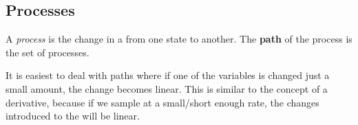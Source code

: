 \subsection{Processes}\label{subsec:Processes}
\begin{definition}[Process]\label{def:Process}
  A \emph{process} is the change in a  from one  state to another.
  The \textbf{path} of the process is the set of  processes.

  It is easiest to deal with paths where if one of the variables is changed just a small amount, the change becomes linear.
  This is similar to the concept of a derivative, because if we sample at a small/short enough rate, the changes introduced to the  will be linear.
\end{definition}


